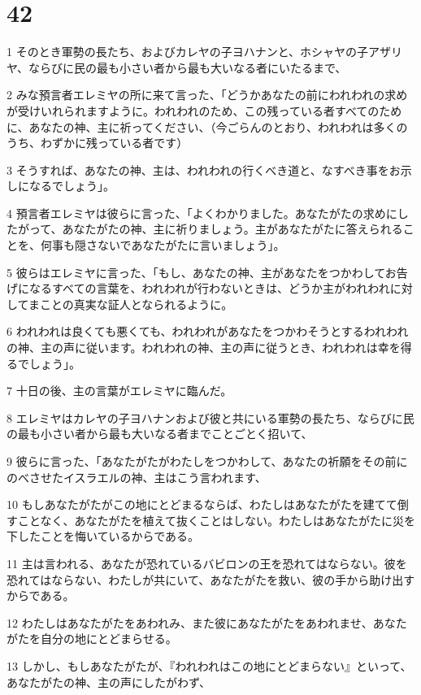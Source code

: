 \chapter{42}

\par 1 そのとき軍勢の長たち、およびカレヤの子ヨハナンと、ホシャヤの子アザリヤ、ならびに民の最も小さい者から最も大いなる者にいたるまで、
\par 2 みな預言者エレミヤの所に来て言った、「どうかあなたの前にわれわれの求めが受けいれられますように。われわれのため、この残っている者すべてのために、あなたの神、主に祈ってください、（今ごらんのとおり、われわれは多くのうち、わずかに残っている者です）
\par 3 そうすれば、あなたの神、主は、われわれの行くべき道と、なすべき事をお示しになるでしょう」。
\par 4 預言者エレミヤは彼らに言った、「よくわかりました。あなたがたの求めにしたがって、あなたがたの神、主に祈りましょう。主があなたがたに答えられることを、何事も隠さないであなたがたに言いましょう」。
\par 5 彼らはエレミヤに言った、「もし、あなたの神、主があなたをつかわしてお告げになるすべての言葉を、われわれが行わないときは、どうか主がわれわれに対してまことの真実な証人となられるように。
\par 6 われわれは良くても悪くても、われわれがあなたをつかわそうとするわれわれの神、主の声に従います。われわれの神、主の声に従うとき、われわれは幸を得るでしょう」。
\par 7 十日の後、主の言葉がエレミヤに臨んだ。
\par 8 エレミヤはカレヤの子ヨハナンおよび彼と共にいる軍勢の長たち、ならびに民の最も小さい者から最も大いなる者までことごとく招いて、
\par 9 彼らに言った、「あなたがたがわたしをつかわして、あなたの祈願をその前にのべさせたイスラエルの神、主はこう言われます、
\par 10 もしあなたがたがこの地にとどまるならば、わたしはあなたがたを建てて倒すことなく、あなたがたを植えて抜くことはしない。わたしはあなたがたに災を下したことを悔いているからである。
\par 11 主は言われる、あなたが恐れているバビロンの王を恐れてはならない。彼を恐れてはならない、わたしが共にいて、あなたがたを救い、彼の手から助け出すからである。
\par 12 わたしはあなたがたをあわれみ、また彼にあなたがたをあわれませ、あなたがたを自分の地にとどまらせる。
\par 13 しかし、もしあなたがたが、『われわれはこの地にとどまらない』といって、あなたがたの神、主の声にしたがわず、
